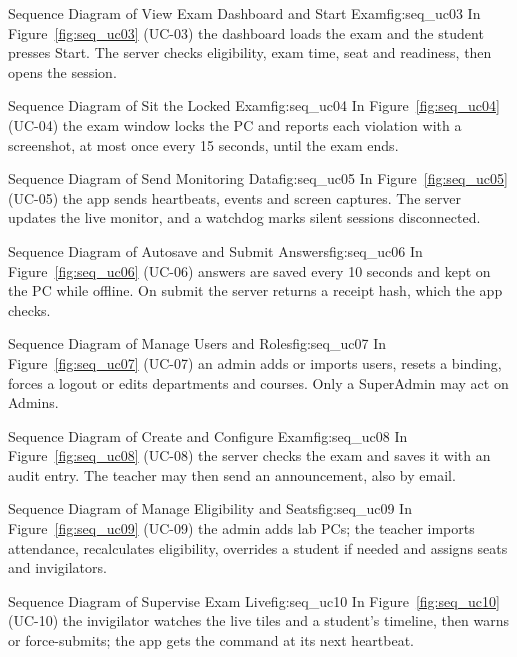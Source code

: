 %
{Sequence Diagram of View Exam Dashboard and Start Exam}{fig:seq_uc03}%
{In Figure~\ref{fig:seq_uc03} (UC-03) the dashboard loads the exam and the student presses Start. The server checks eligibility, exam time, seat and readiness, then opens the session.}

%
{Sequence Diagram of Sit the Locked Exam}{fig:seq_uc04}%
{In Figure~\ref{fig:seq_uc04} (UC-04) the exam window locks the PC and reports each violation with a screenshot, at most once every 15 seconds, until the exam ends.}

%
{Sequence Diagram of Send Monitoring Data}{fig:seq_uc05}%
{In Figure~\ref{fig:seq_uc05} (UC-05) the app sends heartbeats, events and screen captures. The server updates the live monitor, and a watchdog marks silent sessions disconnected.}

%
{Sequence Diagram of Autosave and Submit Answers}{fig:seq_uc06}%
{In Figure~\ref{fig:seq_uc06} (UC-06) answers are saved every 10 seconds and kept on the PC while offline. On submit the server returns a receipt hash, which the app checks.}

%
{Sequence Diagram of Manage Users and Roles}{fig:seq_uc07}%
{In Figure~\ref{fig:seq_uc07} (UC-07) an admin adds or imports users, resets a binding, forces a logout or edits departments and courses. Only a SuperAdmin may act on Admins.}

%
{Sequence Diagram of Create and Configure Exam}{fig:seq_uc08}%
{In Figure~\ref{fig:seq_uc08} (UC-08) the server checks the exam and saves it with an audit entry. The teacher may then send an announcement, also by email.}

%
{Sequence Diagram of Manage Eligibility and Seats}{fig:seq_uc09}%
{In Figure~\ref{fig:seq_uc09} (UC-09) the admin adds lab PCs; the teacher imports attendance, recalculates eligibility, overrides a student if needed and assigns seats and invigilators.}

%
{Sequence Diagram of Supervise Exam Live}{fig:seq_uc10}%
{In Figure~\ref{fig:seq_uc10} (UC-10) the invigilator watches the live tiles and a student's timeline, then warns or force-submits; the app gets the command at its next heartbeat.}

